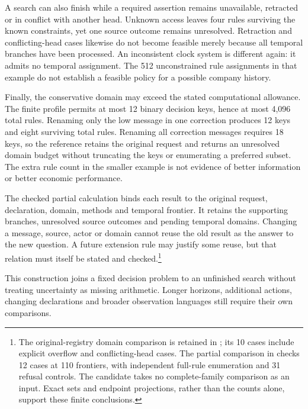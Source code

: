 A search can also finish while a required assertion remains unavailable, retracted or in conflict with another head. Unknown access leaves four rules surviving the known constraints, yet one source outcome remains unresolved. Retraction and conflicting-head cases likewise do not become feasible merely because all temporal branches have been processed. An inconsistent clock system is different again: it admits no temporal assignment. The 512 unconstrained rule assignments in that example do not establish a feasible policy for a possible company history.

Finally, the conservative domain may exceed the stated computational allowance. The finite profile permits at most 12 binary decision keys, hence at most 4,096 total rules. Renaming only the low message in one correction produces 12 keys and eight surviving total rules. Renaming all correction messages requires 18 keys, so the reference retains the original request and returns an unresolved domain budget without truncating the keys or enumerating a preferred subset. The extra rule count in the smaller example is not evidence of better information or better economic performance.

The checked partial calculation binds each result to the original request, declaration, domain, methods and temporal frontier. It retains the supporting branches, unresolved source outcomes and pending temporal domains. Changing a message, source, actor or domain cannot reuse the old result as the answer to the new question. A future extension rule may justify some reuse, but that relation must itself be stated and checked.\footnote{The original-registry domain comparison is retained in ; its 10 cases include explicit overflow and conflicting-head cases. The partial comparison in  checks 12 cases at 110 frontiers, with independent full-rule enumeration and 31 refusal controls. The candidate takes no complete-family comparison as an input. Exact sets and endpoint projections, rather than the counts alone, support these finite conclusions.}

This construction joins a fixed decision problem to an unfinished search without treating uncertainty as missing arithmetic. Longer horizons, additional actions, changing declarations and broader observation languages still require their own comparisons.


